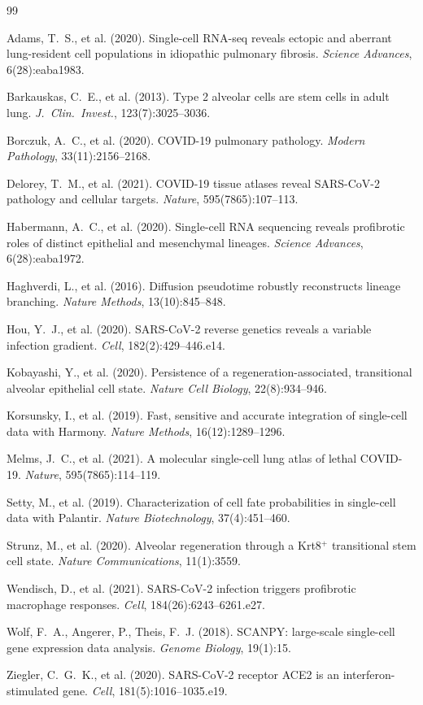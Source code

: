 \documentclass[11pt]{article}
\begin{document}
\begin{thebibliography}{99}
\small

Adams, T.~S., et al. (2020). Single-cell RNA-seq reveals ectopic and aberrant lung-resident cell populations in idiopathic pulmonary fibrosis. \textit{Science Advances}, 6(28):eaba1983.

Barkauskas, C.~E., et al. (2013). Type 2 alveolar cells are stem cells in adult lung. \textit{J.\ Clin.\ Invest.}, 123(7):3025--3036.

Borczuk, A.~C., et al. (2020). COVID-19 pulmonary pathology. \textit{Modern Pathology}, 33(11):2156--2168.

Delorey, T.~M., et al. (2021). COVID-19 tissue atlases reveal SARS-CoV-2 pathology and cellular targets. \textit{Nature}, 595(7865):107--113.

Habermann, A.~C., et al. (2020). Single-cell RNA sequencing reveals profibrotic roles of distinct epithelial and mesenchymal lineages. \textit{Science Advances}, 6(28):eaba1972.

Haghverdi, L., et al. (2016). Diffusion pseudotime robustly reconstructs lineage branching. \textit{Nature Methods}, 13(10):845--848.

Hou, Y.~J., et al. (2020). SARS-CoV-2 reverse genetics reveals a variable infection gradient. \textit{Cell}, 182(2):429--446.e14.

Kobayashi, Y., et al. (2020). Persistence of a regeneration-associated, transitional alveolar epithelial cell state. \textit{Nature Cell Biology}, 22(8):934--946.

Korsunsky, I., et al. (2019). Fast, sensitive and accurate integration of single-cell data with Harmony. \textit{Nature Methods}, 16(12):1289--1296.

Melms, J.~C., et al. (2021). A molecular single-cell lung atlas of lethal COVID-19. \textit{Nature}, 595(7865):114--119.

Setty, M., et al. (2019). Characterization of cell fate probabilities in single-cell data with Palantir. \textit{Nature Biotechnology}, 37(4):451--460.

Strunz, M., et al. (2020). Alveolar regeneration through a Krt8$^+$ transitional stem cell state. \textit{Nature Communications}, 11(1):3559.

Wendisch, D., et al. (2021). SARS-CoV-2 infection triggers profibrotic macrophage responses. \textit{Cell}, 184(26):6243--6261.e27.

Wolf, F.~A., Angerer, P., Theis, F.~J. (2018). SCANPY: large-scale single-cell gene expression data analysis. \textit{Genome Biology}, 19(1):15.

Ziegler, C.~G.~K., et al. (2020). SARS-CoV-2 receptor ACE2 is an interferon-stimulated gene. \textit{Cell}, 181(5):1016--1035.e19.

\end{thebibliography}
\end{document}
